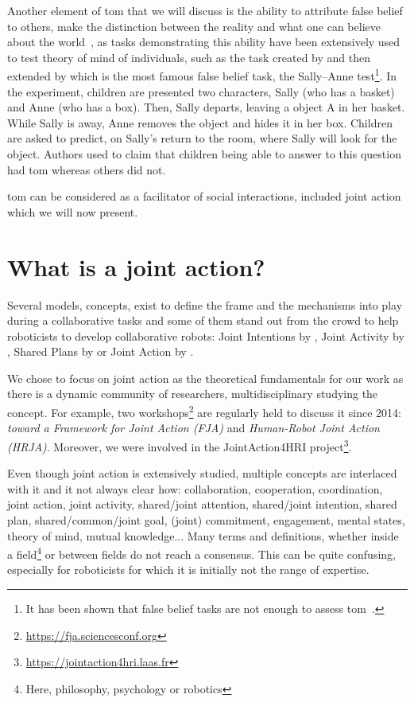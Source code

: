 \documentclass[a4paper,11pt,twoside]{StyleThese}
\begin{document}
Another element of \acrshort{tom} that we will discuss is the ability to attribute false belief to others, \ie make the distinction between the reality and what one can believe about the world~\citep{dennett_1978_brainstorms}, as tasks demonstrating this ability have been extensively used to test theory of mind of individuals, such as the task created by \cite{wimmer_1983_beliefs} and then extended by \cite{baron_1985_does} which is the most famous false belief task, the Sally--Anne test\footnote{It has been shown that false belief tasks are not enough to assess \acrshort{tom}~\citep{bloom_2000_two, wellman_2001_meta}.}. In the experiment, children are presented two characters, Sally (who has a basket) and Anne (who has a box). Then, Sally departs, leaving a object A in her basket. While Sally is away, Anne removes the object and hides it in her box. Children are asked to predict, on Sally's return to the room, where Sally will look for the object. Authors used to claim that children being able to answer to this question had \acrshort{tom} whereas others did not.

\bigskip

\acrlong{tom} can be considered as a facilitator of social interactions, included joint action which we will now present.

\section{What is a joint action?}\label{chap1:sec:ja}
Several models, concepts, exist to define the frame and the mechanisms into play during a collaborative tasks and some of them stand out from the crowd to help roboticists to develop collaborative robots: Joint Intentions by \cite{cohen_1991_teamwork}, Joint Activity by \cite{klein_2005_common}, Shared Plans by \cite{grosz_1996_collaborative} or Joint Action by \cite{sebanz_2006_joint}.

We chose to focus on joint action as the theoretical fundamentals for our work as there is a dynamic community of researchers, multidisciplinary studying the concept. For example, two workshops\footnote{\url{https://fja.sciencesconf.org}} are regularly held to discuss it since 2014: \textit{toward a Framework for Joint Action (FJA)} and \textit{Human-Robot Joint Action (HRJA)}. Moreover, we were involved in the JointAction4HRI project\footnote{\url{https://jointaction4hri.laas.fr}}.

Even though joint action is extensively studied, multiple concepts are interlaced with it and it not always clear how: collaboration, cooperation, coordination, joint action, joint activity, shared/joint attention, shared/joint intention, shared plan, shared/common/joint goal, (joint) commitment, engagement, mental states, theory of mind, mutual knowledge... Many terms and definitions, whether inside a field\footnote{Here, philosophy, psychology or robotics} or between fields do not reach a consensus. This can be quite confusing, especially for roboticists for which it is initially not the range of expertise. 
\end{document}
